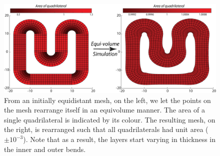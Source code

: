 \begin{figure}[ht]
\centering
\includegraphics[width=1.\textwidth, clip=true]{./Chapters/03_GLM/./Images/Simulation}
\caption{From an initially equidistant mesh, on the left, we let the points on the mesh rearrange itself in an equivolume manner. The area of a single quadrilateral is indicated by its colour. The resulting mesh, on the right, is rearranged such that all quadrilaterals had unit area ($\pm 10^{-3}$). Note that as a result, the layers start varying in thickness in the inner and outer bends.}
\label{fig:simulation}
\end{figure}